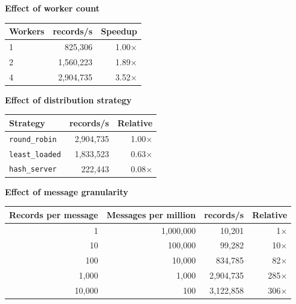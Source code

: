 \documentclass[11pt,a4paper]{article}
\begin{document}
\begin{minipage}[t]{0.46\textwidth}\small
\textbf{Effect of worker count}
\begin{center}
\begin{tabular}{@{}lrr@{}}
\toprule
\textbf{Workers} & \textbf{records/s} & \textbf{Speedup} \\ \midrule
1 & 825,306 & 1.00$\times$ \\
2 & 1,560,223 & 1.89$\times$ \\
4 & 2,904,735 & 3.52$\times$ \\
\bottomrule
\end{tabular}
\end{center}
\end{minipage}\hfill
\begin{minipage}[t]{0.5\textwidth}\small
\textbf{Effect of distribution strategy}
\begin{center}
\begin{tabular}{@{}lrr@{}}
\toprule
\textbf{Strategy} & \textbf{records/s} & \textbf{Relative} \\ \midrule
\texttt{round\_robin} & 2,904,735 & 1.00$\times$ \\
\texttt{least\_loaded} & 1,833,523 & 0.63$\times$ \\
\texttt{hash\_server} & 222,443 & 0.08$\times$ \\
\bottomrule
\end{tabular}
\end{center}
\end{minipage}

\vspace{0.6em}
\textbf{Effect of message granularity}
\begin{center}\small
\begin{tabular}{@{}rrrr@{}}
\toprule
\textbf{Records per message} & \textbf{Messages per million} & \textbf{records/s} & \textbf{Relative} \\ \midrule
1 & 1,000,000 & 10,201 & 1$\times$ \\
10 & 100,000 & 99,282 & 10$\times$ \\
100 & 10,000 & 834,785 & 82$\times$ \\
1,000 & 1,000 & 2,904,735 & 285$\times$ \\
10,000 & 100 & 3,122,858 & 306$\times$ \\
\bottomrule
\end{tabular}
\end{center}
\end{document}
